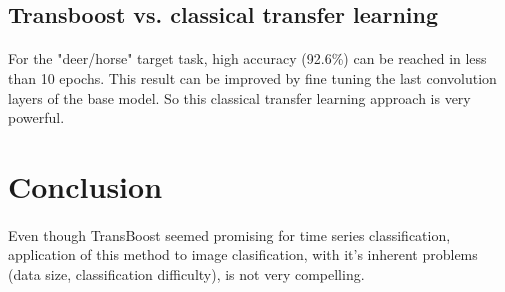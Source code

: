 \documentclass[11 pt]{article}
\begin{document}
\subsection{Transboost vs. classical transfer learning}

\paragraph{} For the "deer/horse" target task, high accuracy (92.6\%) can be reached in less than 10 epochs. This result can be improved by fine tuning the last convolution layers of the base model. So this classical transfer learning approach is very powerful.

\section{Conclusion}

\paragraph{}Even though TransBoost seemed promising for time series classification, application of this method to image clasification, with it's inherent problems (data size, classification difficulty), is not very compelling.

\end{document}
